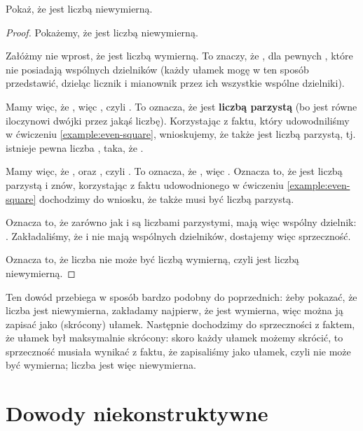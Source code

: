 \begin{example}
\label{example:irrational}
Pokaż, że  jest liczbą niewymierną.

\begin{proof}
Pokażemy, że  jest liczbą niewymierną.

Załóżmy nie wprost, że  jest liczbą wymierną. To znaczy, że , dla pewnych , które nie posiadają wspólnych dzielników (każdy ułamek mogę w ten sposób przedstawić, dzieląc licznik i mianownik przez ich wszystkie wspólne dzielniki).

Mamy więc, że , więc , czyli . To oznacza, że  jest \textbf{liczbą parzystą} (bo jest równe iloczynowi dwójki przez jakąś liczbę). Korzystając z faktu, który udowodniliśmy w ćwiczeniu \ref{example:even-square}, wnioskujemy, że  także jest liczbą parzystą, tj. istnieje pewna liczba , taka, że . 

Mamy więc, że , oraz , czyli . To oznacza, że , więc . Oznacza to, że  jest liczbą parzystą i znów, korzystając z faktu udowodnionego w ćwiczeniu \ref{example:even-square} dochodzimy do wniosku, że  także musi być liczbą parzystą.

Oznacza to, że zarówno  jak i  są liczbami parzystymi, mają więc wspólny dzielnik: . Zakładaliśmy, że  i  nie mają wspólnych dzielników, dostajemy więc sprzeczność.

Oznacza to, że liczba  nie może być liczbą wymierną, czyli  jest liczbą niewymierną.
\end{proof}

Ten dowód przebiega w sposób bardzo podobny do poprzednich: żeby pokazać, że liczba  jest niewymierna, zakładamy najpierw, że jest wymierna, więc można ją zapisać jako (skrócony) ułamek. Następnie dochodzimy do sprzeczności z faktem, że ułamek był maksymalnie skrócony: skoro każdy ułamek możemy skrócić, to sprzeczność musiała wynikać z faktu, że zapisaliśmy  jako ułamek, czyli  nie może być wymierna; liczba  jest więc niewymierna.

\end{example}

\section{Dowody niekonstruktywne}

